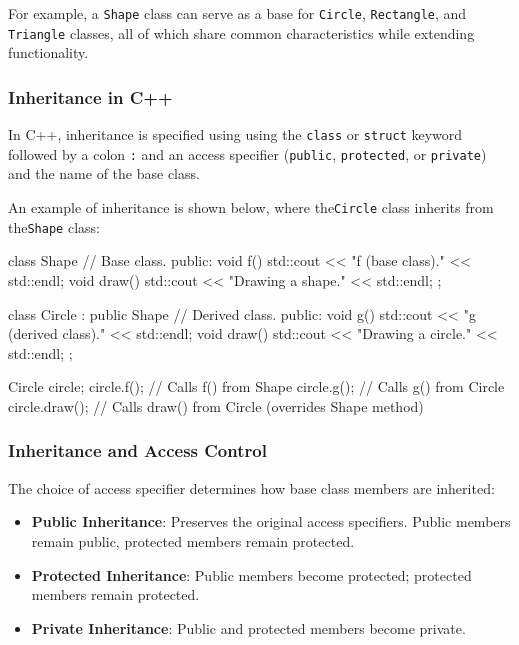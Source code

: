 For example, a \texttt{Shape} class can serve as a base for \texttt{Circle}, \texttt{Rectangle}, and \texttt{Triangle} classes, all of which share common characteristics while extending functionality.

\subsubsection{Inheritance in C++}

In C++, inheritance is specified using using the \texttt{class} or \texttt{struct} keyword followed by a colon \texttt{:} and an access specifier (\texttt{public}, \texttt{protected}, or \texttt{private}) and the name of the base class.

\begin{exampleblock}[Inheritance]

    An example of inheritance is shown below, where the\texttt{Circle} class inherits from the\texttt{Shape} class:

\begin{codeblock}[language=C++]
class Shape { // Base class.
public:
    void f() { std::cout << "f (base class)." << std::endl; }
    void draw() { std::cout << "Drawing a shape." << std::endl; }
};

class Circle : public Shape { // Derived class.
public:
    void g() { std::cout << "g (derived class)." << std::endl; }
    void draw() { std::cout << "Drawing a circle." << std::endl; }
};

Circle circle;
circle.f();    // Calls f() from Shape
circle.g();    // Calls g() from Circle
circle.draw(); // Calls draw() from Circle (overrides Shape method)
\end{codeblock}
\end{exampleblock}

\subsubsection{Inheritance and Access Control}

The choice of access specifier determines how base class members are inherited:

\begin{itemize}
    \item \textbf{Public Inheritance}: Preserves the original access specifiers. Public members remain public, protected members remain protected.
    \item \textbf{Protected Inheritance}: Public members become protected; protected members remain protected.
    \item \textbf{Private Inheritance}: Public and protected members become private.
\end{itemize}

